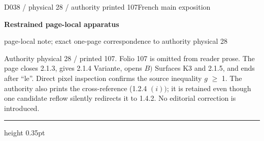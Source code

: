\documentclass[9pt]{article}
\newcommand{\CanonText}[1]{\par{\fontsize{8.0}{9.35}\selectfont\RaggedRight #1\par}\vspace{2.2pt}}
\newcommand{\LayerTitle}{Restrained page-local apparatus}
\begin{document}
\noindent\begin{minipage}[t][\dimexpr\textheight-5pt\relax][t]{\textwidth}
{\sffamily\fontsize{7.3}{8.2}\selectfont\color{Quiet} D038 / physical 28 / authority printed 107\hfill French main exposition}
\par{}\vspace{4.5pt}
{\sffamily\fontsize{10.4}{11.6}\selectfont\bfseries\color{Accent} \LayerTitle}
\par{\sffamily\fontsize{6.7}{7.7}\selectfont\color{Quiet} page-local note; exact one-page correspondence to authority physical 28}
\vspace{5pt}
\CanonText{Authority physical 28 / printed 107. Folio 107 is omitted from reader prose. The page closes 2.1.3, gives 2.1.4 Variante, opens \(B)\) Surfaces K3 and 2.1.5, and ends after “le”. Direct pixel inspection confirms the source inequality \(g\) \(\geq{}\) 1. The authority also prints the cross-reference (1.2.4 \((i))\); it is retained even though one candidate reflow silently redirects it to 1.4.2. No editorial correction is introduced.}
\vfill
{\color{Accent}\hrule height 0.35pt}\vspace{3pt}
\end{minipage}
\newpage
\end{document}
